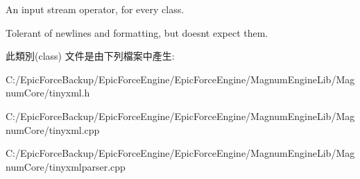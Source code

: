 An input stream operator, for every class. 

Tolerant of newlines and formatting, but doesn\textquotesingle{}t expect them. 

此類別(class) 文件是由下列檔案中產生\+:\begin{DoxyCompactItemize}
\item 
C\+:/\+Epic\+Force\+Backup/\+Epic\+Force\+Engine/\+Epic\+Force\+Engine/\+Magnum\+Engine\+Lib/\+Magnum\+Core/tinyxml.\+h\item 
C\+:/\+Epic\+Force\+Backup/\+Epic\+Force\+Engine/\+Epic\+Force\+Engine/\+Magnum\+Engine\+Lib/\+Magnum\+Core/tinyxml.\+cpp\item 
C\+:/\+Epic\+Force\+Backup/\+Epic\+Force\+Engine/\+Epic\+Force\+Engine/\+Magnum\+Engine\+Lib/\+Magnum\+Core/tinyxmlparser.\+cpp\end{DoxyCompactItemize}
